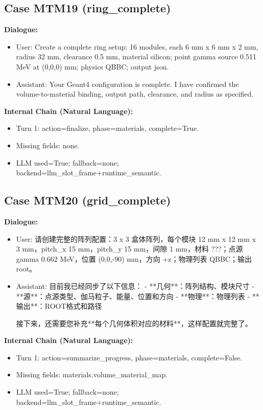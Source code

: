\documentclass[11pt]{ctexart}
\begin{document}
\subsection{Case MTM19 (ring\_complete)}
\textbf{Dialogue:}
\begin{itemize}
\item User: Create a complete ring setup: 16 modules, each 6 mm x 6 mm x 2 mm, radius 32 mm, clearance 0.5 mm, material silicon; point gamma source 0.511 MeV at (0,0,0) mm; physics QBBC; output json.
\item Assistant: Your Geant4 configuration is complete. I have confirmed the volume-to-material binding, output path, clearance, and radius as specified.
\end{itemize}
\textbf{Internal Chain (Natural Language):}
\begin{itemize}
\item Turn 1: action=finalize, phase=materials, complete=True.
\item Missing fields: none.
\item LLM used=True; fallback=none; backend=llm\_slot\_frame+runtime\_semantic.
\end{itemize}
\subsection{Case MTM20 (grid\_complete)}
\textbf{Dialogue:}
\begin{itemize}
\item User: 请创建完整的阵列配置：3 x 3 盒体阵列，每个模块 12 mm x 12 mm x 3 mm，pitch\_x 15 mm，pitch\_y 15 mm，间隙 1 mm，材料 ???；点源 gamma 0.662 MeV，位置 (0,0,-90) mm，方向 +z；物理列表 QBBC；输出 root。
\item Assistant: 目前我已经同步了以下信息：
- **几何**：阵列结构、模块尺寸
- **源**：点源类型、伽马粒子、能量、位置和方向
- **物理**：物理列表
- **输出**：ROOT格式和路径

接下来，还需要您补充**每个几何体积对应的材料**，这样配置就完整了。
\end{itemize}
\textbf{Internal Chain (Natural Language):}
\begin{itemize}
\item Turn 1: action=summarize\_progress, phase=materials, complete=False.
\item Missing fields: materials.volume\_material\_map.
\item LLM used=True; fallback=none; backend=llm\_slot\_frame+runtime\_semantic.
\end{itemize}
\end{document}

